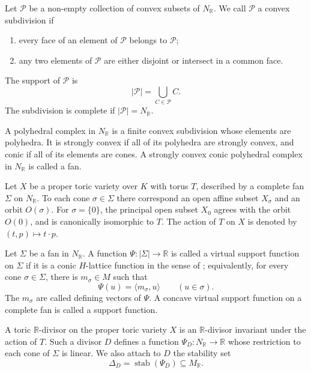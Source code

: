\documentclass[10pt,a4paper]{amsart}
\theoremstyle{plain}
\theoremstyle{plain}
\numberwithin{equation}{section}
\begin{document}
\begin{defn}
	Let \(\mathscr P\) be a non-empty collection of convex subsets of
	\(N_{\mathbb R}\).  We call \(\mathscr P\) a convex subdivision if
	\begin{enumerate}[label=\textup{(\arabic*)},leftmargin=2em]
		\item every face of an element of \(\mathscr P\) belongs to \(\mathscr P\);
		\item any two elements of \(\mathscr P\) are either disjoint or intersect in a
		common face.
	\end{enumerate}
	The support of \(\mathscr P\) is
	\[
	|\mathscr P|=\bigcup_{C\in\mathscr P}C.
	\]
	The subdivision is complete if \(|\mathscr P|=N_{\mathbb R}\).
\end{defn}
\begin{defn}
	A polyhedral complex in \(N_{\mathbb R}\) is a finite convex subdivision
	whose elements are polyhedra.  It is strongly convex if all of its polyhedra
	are strongly convex, and conic if all of its elements are cones.  A strongly
	convex conic polyhedral complex in \(N_{\mathbb R}\) is called a fan.
\end{defn}
Let \(X\) be a proper toric variety over \(K\) with torus \(T\), described by a
complete fan \(\Sigma\) on \(N_{\mathbb R}\).  To each cone
\(\sigma\in\Sigma\) there correspond an open affine subset \(X_\sigma\) and an
orbit \(O(\sigma)\).  For \(\sigma=\{0\}\), the principal open subset \(X_0\)
agrees with the orbit \(O(0)\), and is canonically isomorphic to \(T\).  The
action of \(T\) on \(X\) is denoted by \((t,p)\mapsto t\cdot p\).
\begin{defn}
	Let \(\Sigma\) be a fan in \(N_{\mathbb R}\).  A function
	\(\Psi:|\Sigma|\to\mathbb R\) is called a virtual support function on
	\(\Sigma\) if it is a conic \(H\)-lattice function in the sense of
	\cite[Definition~2.6.6]{BPS14}; equivalently, for every cone
	\(\sigma\in\Sigma\), there is \(m_\sigma\in M\) such that
	\[
	\Psi(u)=\langle m_\sigma,u\rangle
	\qquad (u\in\sigma).
	\]
	The \(m_\sigma\) are called defining vectors of \(\Psi\).  A concave virtual
	support function on a complete fan is called a support function.
	
	A toric \(\mathbb R\)-divisor on the proper toric variety \(X\) is an
	\(\mathbb R\)-divisor invariant under the action of \(T\).  Such a divisor
	\(D\) defines a function \(\Psi_D:N_{\mathbb R}\to\mathbb R\) whose restriction
	to each cone of \(\Sigma\) is linear.  We also attach to \(D\) the stability
	set
	\[
	\Delta_D=\operatorname{stab}(\Psi_D)\subseteq M_{\mathbb R}.
	\]
\end{defn}
\end{document}
